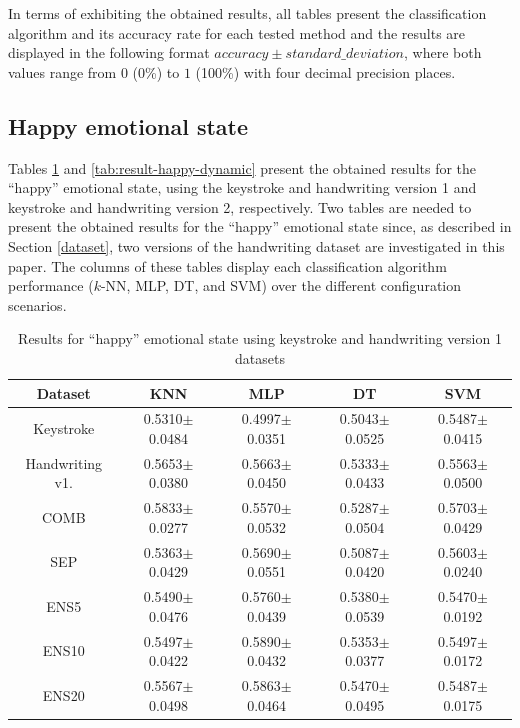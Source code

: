 \documentclass[conference]{IEEEtran}
\begin{document}
In terms of exhibiting the obtained results, all tables present the classification algorithm and its accuracy rate for each tested method and the results are displayed in the following format $accuracy\pm standard\_deviation$, where both values range from $0$ (0\%) to $1$ (100\%) with four decimal precision places.

\subsection{Happy emotional state}
\label{results-happy}

Tables \ref{tab:result-happy-full} and \ref{tab:result-happy-dynamic} present the obtained results for the ``happy'' emotional state,  using the keystroke and handwriting version 1 and keystroke and handwriting version 2, respectively. Two tables are needed to present the obtained results for the ``happy'' emotional state since, as described in Section \ref{dataset}, two versions of the handwriting dataset are investigated in this paper. The columns of these tables display each classification algorithm performance ($k$-NN, MLP, DT, and SVM) over the different configuration scenarios.

\begin{table}
    \centering
    \caption{Results for ``happy'' emotional state  using keystroke and handwriting version 1 datasets}
    \label{tab:result-happy-full}
    \begin{tabular}{|c|c|c|c|c|}
\hline
\textbf{Dataset}          & \textbf{KNN}        & \textbf{MLP}        & \textbf{DT}         & \textbf{SVM}        \\ \hline
Keystroke            & 0.5310$\pm$0.0484 & 0.4997$\pm$0.0351 & 0.5043$\pm$0.0525 & 0.5487$\pm$0.0415 \\ \hline
Handwriting v1. & 0.5653$\pm$0.0380 & 0.5663$\pm$0.0450 & 0.5333$\pm$0.0433 & 0.5563$\pm$0.0500 \\ \hline
COMB                  & 0.5833$\pm$0.0277 & 0.5570$\pm$0.0532 & 0.5287$\pm$0.0504 & 0.5703$\pm$0.0429 \\ \hline
SEP                & 0.5363$\pm$0.0429 & 0.5690$\pm$0.0551 & 0.5087$\pm$0.0420 & 0.5603$\pm$0.0240 \\ \hline
ENS5  & 0.5490$\pm$0.0476 & 0.5760$\pm$0.0439 & 0.5380$\pm$0.0539 & 0.5470$\pm$0.0192 \\ \hline
ENS10 & 0.5497$\pm$0.0422 & 0.5890$\pm$0.0432 & 0.5353$\pm$0.0377 & 0.5497$\pm$0.0172 \\ \hline
ENS20 & 0.5567$\pm$0.0498 & 0.5863$\pm$0.0464 & 0.5470$\pm$0.0495 & 0.5487$\pm$0.0175 \\ \hline
\end{tabular}%
\end{table} 
\end{document}
